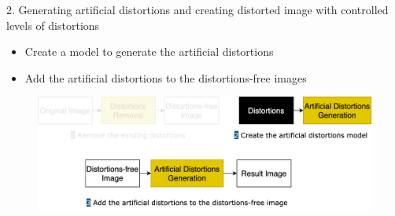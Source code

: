 \documentclass{libs/ufc_format}
\begin{document}
\begin{frame}{2. Generating artificial distortions and creating distorted image with controlled levels of distortions}
    \begin{itemize}
        \item Create a model to generate the artificial distortions
        \item Add the artificial distortions to the distortions-free images
    \end{itemize}
    \begin{figure}
        \includegraphics[width=\textwidth]{libs/stage2.png}
    \end{figure}
\end{frame}
\end{document}
